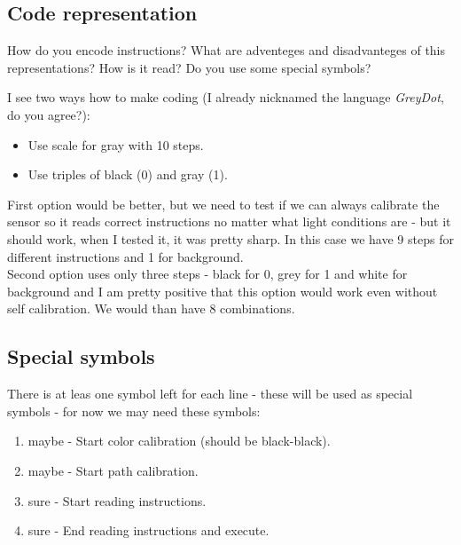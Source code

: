 \subsection{Code representation}
How do you encode instructions? What are adventeges and disadvanteges of this representations? How is it read? Do you use some special symbols?

I see two ways how to make coding (I already nicknamed the language \emph{GreyDot}, do you agree?):
\begin{itemize}
\item Use scale for gray with 10 steps.
\item Use triples of black (0) and gray (1).
\end{itemize}
First option would be better, but we need to test if we can always calibrate the sensor so it reads correct instructions no matter what light conditions are - but it should work, when I tested it, it was pretty sharp. In this case we have 9 steps for different instructions and 1 for background. \\
Second option uses only three steps - black for 0, grey for 1 and white for background and I am pretty positive that this option would work even without self calibration. We would than have 8 combinations.

\subsection{Special symbols}
There is at leas one symbol left for each line - these will be used as special symbols - for now we may need these symbols:
\begin{enumerate}
\item maybe - Start color calibration (should be black-black).
\item maybe - Start path calibration.
\item sure - Start reading instructions.
\item sure - End reading instructions and execute.
\end{enumerate}